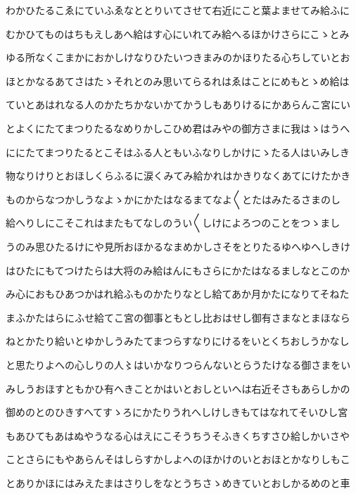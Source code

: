 \documentclass[a4paper,11pt,landscape]{ltjtarticle}
\begin{document}
わかひたるこゑにていふゑなととりいてさせて右近にこと葉よませてみ給ふに
\par\medskip
むかひてものはちもえしあへ給はす心にいれてみ給へるほかけさらにこゝとみ
\par\medskip
ゆる所なくこまかにおかしけなりひたいつきまみのかほりたる心ちしていとお
\par\medskip
ほとかなるあてさはたゝそれとのみ思いてらるれはゑはことにめもとゝめ給は
\par\medskip
ていとあはれなる人のかたちかないかてかうしもありけるにかあらんこ宮にい
\par\medskip
とよくにたてまつりたるなめりかしこひめ君はみやの御方さまに我はゝはうへ
\par\medskip
ににたてまつりたるとこそはふる人ともいふなりしかけにゝたる人はいみしき
\par\medskip
物なりけりとおほしくらふるに涙くみてみ給かれはかきりなくあてにけたかき
\par\medskip
ものからなつかしうなよゝかにかたはなるまてなよ〱とたはみたるさまのし
\par\medskip
給へりしにこそこれはまたもてなしのうい〱しけによろつのことをつゝまし
\par\medskip
うのみ思ひたるけにや見所おほかるなまめかしさそをとりたるゆへゆへしきけ
\par\medskip
はひたにもてつけたらは大将のみ給はんにもさらにかたはなるましなとこのか
\par\medskip
み心におもひあつかはれ給ふものかたりなとし給てあか月かたになりてそねた
\par\medskip
まふかたはらにふせ給てこ宮の御事ともとし比おはせし御有さまなとまほなら
\par\medskip
ねとかたり給いとゆかしうみたてまつらすなりにけるをいとくちおしうかなし
\par\medskip
と思たりよへの心しりの人〻はいかなりつらんないとらうたけなる御さまをい
\par\medskip
みしうおほすともかひ有へきことかはいとおしといへは右近そさもあらしかの
\par\medskip
御めのとのひきすへてすゝろにかたりうれへしけしきもてはなれてそいひし宮
\par\medskip
もあひてもあはぬやうなる心はえにこそうちうそふきくちすさひ給しかいさや
\par\medskip
ことさらにもやあらんそはしらすかしよへのほかけのいとおほとかなりしもこ
\par\medskip
とありかほにはみえたまはさりしをなとうちさゝめきていとおしかるめのと車
\par\medskip
\end{document}
